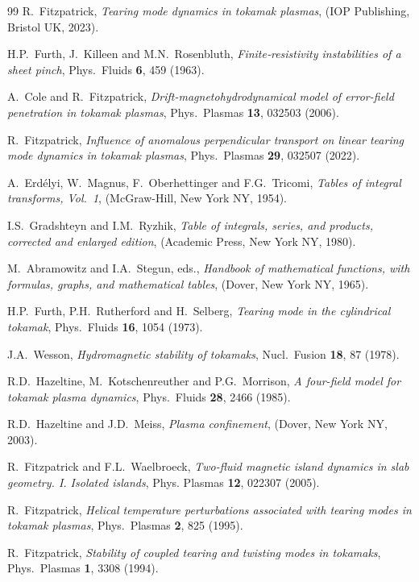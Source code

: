\documentclass[12pt,prb,aps]{revtex4-1}
\begin{document}
\begin{thebibliography}{99}
 R.~Fitzpatrick, {\em Tearing mode dynamics in tokamak plasmas}, (IOP Publishing, Bristol UK, 2023). 

 H.P.~Furth,  J.~Killeen and M.N.~Rosenbluth,  {\em Finite‐resistivity instabilities of a sheet pinch}, Phys.\ Fluids {\bf 6}, 459 (1963).

 A.~Cole and R.~Fitzpatrick, {\em Drift-magnetohydrodynamical model of error-field penetration in tokamak plasmas}, Phys.\ Plasmas {\bf 13}, 032503 (2006).

 R.~Fitzpatrick, {\em Influence of anomalous perpendicular transport on linear tearing mode dynamics in tokamak plasmas}, Phys.\ Plasmas {\bf 29}, 032507 (2022).

 A.~Erd\'{e}lyi, W.~Magnus, F.~Oberhettinger and F.G.~Tricomi, {\em Tables of integral transforms, Vol.~1}, (McGraw-Hill, New York NY, 1954).

 I.S.~Gradshteyn and I.M.~Ryzhik, {\em Table of integrals, series, and products, corrected and enlarged edition}, (Academic Press, New York NY,  1980). 

 M.~Abramowitz and I.A.~Stegun, eds., {\em Handbook of mathematical functions, with formulas, graphs, and mathematical tables},  (Dover, New York NY, 1965).

 H.P.~Furth, P.H.~Rutherford and H.~Selberg, {\em Tearing mode in the cylindrical tokamak}, Phys.\  Fluids {\bf 16}, 1054 (1973). 

 J.A.~Wesson, {\em Hydromagnetic stability of tokamaks}, Nucl.\ Fusion {\bf 18}, 87 (1978).

 R.D.~Hazeltine, M.~Kotschenreuther and P.G.~Morrison, {\em A four-field model for tokamak plasma dynamics}, Phys.\ Fluids {\bf 28}, 2466 (1985).

 R.D.~Hazeltine and J.D.~Meiss, {\em Plasma confinement}, (Dover, New York NY, 2003).

 R.~Fitzpatrick and F.L.~Waelbroeck, {\em Two-fluid magnetic island dynamics in slab geometry. I. Isolated islands}, Phys. Plasmas {\bf 12}, 022307 (2005).

 R.~Fitzpatrick, {\em Helical temperature perturbations associated with tearing modes in tokamak plasmas}, Phys.\ Plasmas {\bf 2}, 825 (1995).

 R.~Fitzpatrick, {\em Stability of coupled tearing and twisting modes in tokamaks}, Phys.\ Plasmas {\bf 1}, 3308 (1994).


\end{thebibliography}
\end{document}
